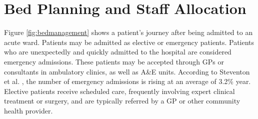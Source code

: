 \documentclass[../thesis.tex]{subfiles}
\begin{document}
\begin{itemize}
\end{itemize}


\section{Bed Planning and Staff Allocation}
Figure \ref{fig:bedmanagement} shows a patient's journey after being admitted to an acute ward. Patients may be admitted as elective or emergency patients. Patients who are unexpectedly and quickly admitted to the hospital are considered emergency admissions. These patients may be accepted through GPs or consultants in ambulatory clinics, as well as A\&E units. According to Steventon et al. \cite{Steventon2018}, the number of emergency admissions is rising at an average of 3.2\% year. Elective patients receive scheduled care, frequently involving expert clinical treatment or surgery, and are typically referred by a GP or other community health provider.
\end{document}
